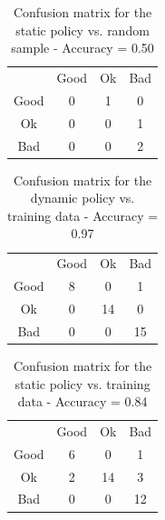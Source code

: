 \documentclass[12pt, conference, compsocconf]{IEEEtran}
\begin{document}
\begin{table}[h!]
\centering
\begin{tabular}{cccc}
                          & Good                   & Ok                     & Bad                    \\ \cline{2-4} 
\multicolumn{1}{c|}{Good} & \multicolumn{1}{c|}{0} & \multicolumn{1}{c|}{1} & \multicolumn{1}{c|}{0} \\ \cline{2-4} 
\multicolumn{1}{c|}{Ok}   & \multicolumn{1}{c|}{0} & \multicolumn{1}{c|}{0} & \multicolumn{1}{c|}{1} \\ \cline{2-4} 
\multicolumn{1}{c|}{Bad}  & \multicolumn{1}{c|}{0} & \multicolumn{1}{c|}{0} & \multicolumn{1}{c|}{2} \\ \cline{2-4} 
\end{tabular}
\caption{Confusion matrix for the static policy vs. random sample - Accuracy = 0.50}
\label{cm-static-test}
\end{table}

\begin{table}[h!]
\centering
\begin{tabular}{cccc}
                          & Good                   & Ok                      & Bad                     \\ \cline{2-4} 
\multicolumn{1}{c|}{Good} & \multicolumn{1}{c|}{8} & \multicolumn{1}{c|}{0}  & \multicolumn{1}{c|}{1}  \\ \cline{2-4} 
\multicolumn{1}{c|}{Ok}   & \multicolumn{1}{c|}{0} & \multicolumn{1}{c|}{14} & \multicolumn{1}{c|}{0}  \\ \cline{2-4} 
\multicolumn{1}{c|}{Bad}  & \multicolumn{1}{c|}{0} & \multicolumn{1}{c|}{0}  & \multicolumn{1}{c|}{15} \\ \cline{2-4} 
\end{tabular}
\caption{Confusion matrix for the dynamic policy vs. training data - Accuracy = 0.97}
\label{cm-dynamic-training}
\end{table}

\begin{table}[h!]
\centering
\begin{tabular}{cccc}
                          & Good                   & Ok                      & Bad                     \\ \cline{2-4} 
\multicolumn{1}{c|}{Good} & \multicolumn{1}{c|}{6} & \multicolumn{1}{c|}{0}  & \multicolumn{1}{c|}{1}  \\ \cline{2-4} 
\multicolumn{1}{c|}{Ok}   & \multicolumn{1}{c|}{2} & \multicolumn{1}{c|}{14} & \multicolumn{1}{c|}{3}  \\ \cline{2-4} 
\multicolumn{1}{c|}{Bad}  & \multicolumn{1}{c|}{0} & \multicolumn{1}{c|}{0}  & \multicolumn{1}{c|}{12} \\ \cline{2-4} 
\end{tabular}
\caption{Confusion matrix for the static policy vs. training data - Accuracy = 0.84}
\label{cm-static-training}
\end{table}
\end{document}
